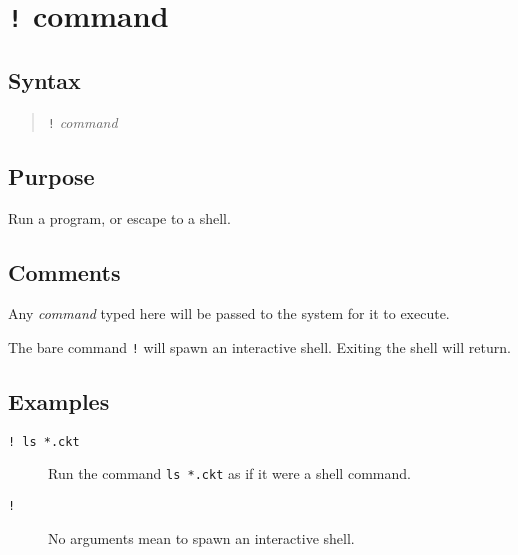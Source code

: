 %
%
%
%
\section{{\tt !} command}
\subsection{Syntax}
\begin{verse}
{\tt !} {{\it command}}
\end{verse}
\subsection{Purpose}

Run a program, or escape to a shell.
\subsection{Comments}

Any {\it command\/} typed here will be passed to the system for it to execute.

The bare command {\tt !} will spawn an interactive shell.  Exiting the shell
will return.
\subsection{Examples}

\begin{description}

\item[{\tt ! ls *.ckt}] Run the command {\tt ls *.ckt} as if it were a shell
command.

\item[{\tt !}] No arguments mean to spawn an interactive shell.

\end{description}
